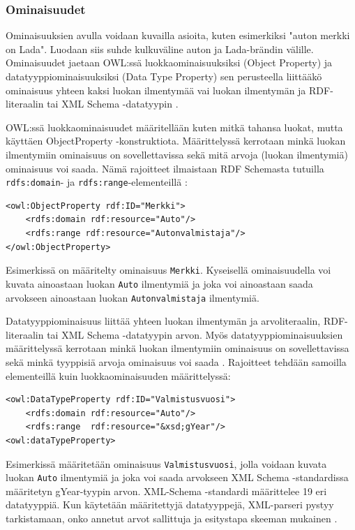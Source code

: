 \documentclass[finnish]{tktltiki2}
\theoremstyle{definition}
\theoremstyle{remark}
\begin{document}
\subsubsection{Ominaisuudet}
Ominaisuuksien avulla voidaan kuvailla asioita, kuten esimerkiksi "auton merkki on Lada". Luodaan siis suhde kulkuväline auton ja Lada-brändin välille. Ominaisuudet jaetaan OWL:ssä luokkaominaisuuksiksi (Object Property) ja datatyyppiominaisuuksiksi (Data Type Property) sen perusteella liittääkö ominaisuus yhteen kaksi luokan ilmentymää vai luokan ilmentymän ja RDF-literaalin tai XML Schema -datatyypin \cite{SWM04}.  

OWL:ssä luokkaominaisuudet määritellään kuten mitkä tahansa luokat, mutta käyttäen ObjectProperty -konstruktiota. Määrittelyssä kerrotaan minkä luokan ilmentymiin ominaisuus on sovellettavissa sekä mitä arvoja (luokan ilmentymiä) ominaisuus voi saada. Nämä rajoitteet ilmaistaan RDF Schemasta tutuilla \texttt{rdfs:domain}- ja \texttt{rdfs:range}-elementeillä \cite{SWM04}:
\begin{verbatim}
<owl:ObjectProperty rdf:ID="Merkki">
    <rdfs:domain rdf:resource="Auto"/>
    <rdfs:range rdf:resource="Autonvalmistaja"/>
</owl:ObjectProperty>
\end{verbatim}
Esimerkissä on määritelty ominaisuus \texttt{Merkki}. Kyseisellä ominaisuudella voi kuvata ainoastaan luokan \texttt{Auto} ilmentymiä ja joka voi ainoastaan saada arvokseen ainoastaan luokan \texttt{Autonvalmistaja} ilmentymiä. 

Datatyyppiominaisuus liittää yhteen luokan ilmentymän ja arvoliteraalin, RDF-literaalin tai XML Schema -datatyypin arvon. Myös datatyyppiominaisuuksien määrittelyssä kerrotaan minkä luokan ilmentymiin ominaisuus on sovellettavissa sekä minkä tyyppisiä arvoja ominaisuus voi saada \cite{SWM04}. Rajoitteet tehdään samoilla elementeillä kuin luokkaominaisuuden määrittelyssä:
\begin{verbatim}
<owl:DataTypeProperty rdf:ID="Valmistusvuosi">
    <rdfs:domain rdf:resource="Auto"/>
    <rdfs:range  rdf:resource="&xsd;gYear"/>   
<owl:dataTypeProperty>
\end{verbatim}
Esimerkissä määritetään ominaisuus \texttt{Valmistusvuosi}, jolla voidaan kuvata luokan \texttt{Auto} ilmentymiä ja joka voi saada arvokseen XML Schema -standardissa määritetyn gYear-tyypin arvon. XML-Schema -standardi määrittelee 19 eri datatyyppiä. Kun käytetään määritettyjä datatyyppejä, XML-parseri pystyy tarkistamaan, onko annetut arvot sallittuja ja esitystapa skeeman mukainen \cite{XMLS}.  
\end{document}
